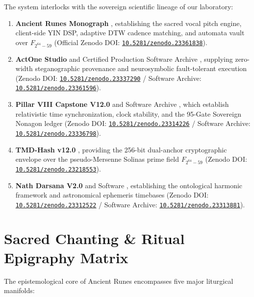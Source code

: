 \documentclass[11pt,a4paper,reqno]{article}
\newcommand{\zenodo}[1]{\href{https://doi.org/10.5281/zenodo.#1}{\nolinkurl{10.5281/zenodo.#1}}}
\def\mathbb#1{#1}%
\theoremstyle{plain}
\theoremstyle{definition}
\theoremstyle{remark}
\numberwithin{equation}{section}
\begin{document}
The system interlocks with the sovereign scientific lineage of our laboratory:
\begin{enumerate}[leftmargin=2.0em, itemsep=0.3em]
    \item \textbf{Ancient Runes Monograph} \cite{ancientrunes2026zenodo}, establishing the sacred vocal pitch engine, client-side YIN DSP, adaptive DTW cadence matching, and automata vault over $\mathbb{F}_{2^{64}-59}$ (Official Zenodo DOI: \zenodo{23361838}).
    \item \textbf{ActOne Studio} \cite{actonemonograph} and Certified Production Software Archive \cite{actonesoftware2026zenodo}, supplying zero-width steganographic provenance and neurosymbolic fault-tolerant execution (Zenodo DOI: \zenodo{23337290} / Software Archive: \zenodo{23361596}).
    \item \textbf{Pillar VIII Capstone V12.0} \cite{capstone12zenodo} and Software Archive \cite{capstonesw12zenodo}, which establish relativistic time synchronization, clock stability, and the 95-Gate Sovereign Nonagon ledger (Zenodo DOI: \zenodo{23314226} / Software Archive: \zenodo{23336798}).
    \item \textbf{TMD-Hash v12.0} \cite{tmd12zenodo}, providing the 256-bit dual-anchor cryptographic envelope over the pseudo-Mersenne Solinas prime field $\mathbb{F}_{2^{64}-59}$ (Zenodo DOI: \zenodo{23218553}).
    \item \textbf{Nath Darsana V2.0} \cite{nathdarsana2zenodo} and Software \cite{nathdarsanasw2zenodo}, establishing the ontological harmonic framework and astronomical ephemeris timebases (Zenodo DOI: \zenodo{23312522} / Software Archive: \zenodo{23313881}).
\end{enumerate}

\section{\texorpdfstring{Sacred Chanting \& Ritual Epigraphy Matrix}{Sacred Chanting and Ritual Epigraphy Matrix}}
\label{sec:epigraphy}

The epistemological core of Ancient Runes encompasses five major liturgical manifolds:
\end{document}
